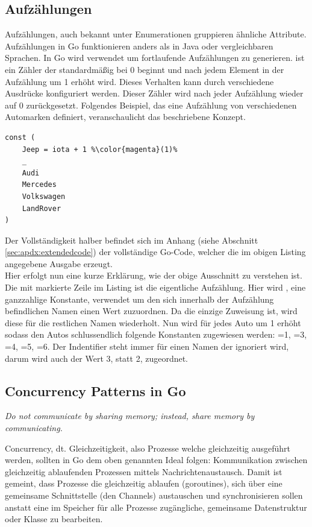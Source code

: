 \subsection{Aufzählungen}
Aufzählungen, auch bekannt unter Enumerationen gruppieren ähnliche Attribute. Aufzählungen in Go funktionieren anders als in Java oder vergleichbaren Sprachen. In Go wird  verwendet um fortlaufende Aufzählungen zu generieren.  ist ein Zähler der standardmäßig bei 0 beginnt und nach jedem Element in der Aufzählung um 1 erhöht wird. Dieses Verhalten kann durch verschiedene Ausdrücke konfiguriert werden. Dieser Zähler wird nach jeder Aufzählung wieder auf 0 zurückgesetzt. Folgendes Beispiel, das eine Aufzählung von verschiedenen Automarken definiert, veranschaulicht das beschriebene Konzept.
\begin{lstlisting}[style=goMono,caption={Aufzählung von Automarken},label={lst:tech:go:enum:ex1}]
const (
    Jeep = iota + 1 %\color{magenta}(1)%
    _
    Audi     
    Mercedes
    Volkswagen
    LandRover
)
\end{lstlisting}
Der Vollständigkeit halber befindet sich im Anhang (siehe Abschnitt \ref{sec:apdx:extendedcode}) der vollständige Go-Code, welcher die im obigen Listing angegebene Ausgabe erzeugt.\\
Hier erfolgt nun eine kurze Erklärung, wie der obige Ausschnitt zu verstehen ist. Die mit  markierte Zeile im Listing ist die eigentliche Aufzählung. Hier wird , eine ganzzahlige Konstante, verwendet um den sich innerhalb der Aufzählung  befindlichen Namen einen Wert zuzuordnen. Da  die einzige Zuweisung ist, wird diese für die restlichen Namen wiederholt. Nun wird  für jedes Auto um 1 erhöht sodass den Autos schlussendlich folgende Konstanten zugewiesen werden: =1, =3, =4, =5, =6. Der \mono{\_} Indentifier steht immer für einen Namen der ignoriert wird, darum wird  auch der Wert 3, statt 2, zugeordnet.

\subsection{Concurrency Patterns in Go}
\begin{tcolorbox}
\centering\textit{%
\frqq{}Do not communicate by sharing memory; instead, share memory by communicating.\flqq \cite{go:proverbs:concurrency} }
\end{tcolorbox}\bigskip
\noindent
Concurrency, dt. Gleichzeitigkeit, also Prozesse welche gleichzeitig ausgeführt werden, sollten in Go dem oben genannten Ideal folgen: Kommunikation zwischen gleichzeitig ablaufenden Prozessen mittels Nachrichtenaustausch. Damit ist gemeint, dass Prozesse die gleichzeitig ablaufen (goroutines), sich über eine gemeinsame Schnittstelle (den Channels) austauschen und synchronisieren sollen anstatt eine im Speicher für alle Prozesse zugängliche, gemeinsame Datenstruktur oder Klasse zu bearbeiten.\bigskip

